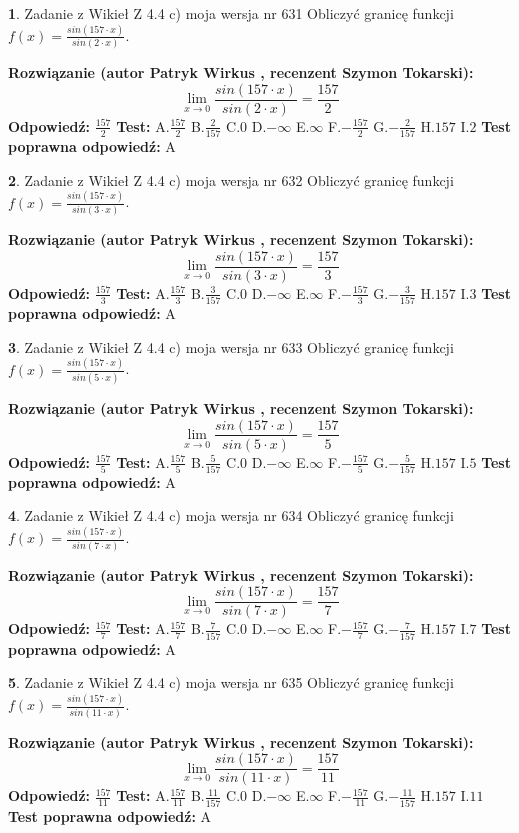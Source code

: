 \documentclass[12pt, a4paper]{article}
\theoremstyle{definition} %
\newtheorem{zad}{}
\newcommand{\zadStart}[1]{\begin{zad}#1\newline}
\newcommand{\zadStop}{\end{zad}}
\newcommand{\rozwStart}[2]{\noindent \textbf{Rozwiązanie (autor #1 , recenzent #2): }\newline}
\newcommand{\rozwStop}{\newline}
\newcommand{\odpStart}{\noindent \textbf{Odpowiedź:}\newline}
\newcommand{\odpStop}{\newline}
\newcommand{\testStart}{\noindent \textbf{Test:}\newline}
\newcommand{\testStop}{\newline}
\newcommand{\kluczStart}{\noindent \textbf{Test poprawna odpowiedź:}\newline}
\newcommand{\kluczStop}{\newline}
\begin{document}
\zadStart{Zadanie z Wikieł Z 4.4 c) moja wersja nr 631}
Obliczyć granicę funkcji $f(x)=\frac{sin(157\cdot x)}{sin(2\cdot x)}$.
\zadStop
\rozwStart{Patryk Wirkus}{Szymon Tokarski}
$$\lim\limits_{x\to 0}\frac{sin(157\cdot x)}{sin(2\cdot x)}=
\frac{157}{2}$$
\rozwStop
\odpStart
$\frac{157}{2}$
\odpStop
\testStart
A.$\frac{157}{2}$
B.$\frac{2}{157}$
C.$0$
D.$-\infty$
E.$\infty$
F.$-\frac{157}{2}$
G.$-\frac{2}{157}$
H.$157$
I.$2$
\testStop
\kluczStart
A
\kluczStop



\zadStart{Zadanie z Wikieł Z 4.4 c) moja wersja nr 632}
Obliczyć granicę funkcji $f(x)=\frac{sin(157\cdot x)}{sin(3\cdot x)}$.
\zadStop
\rozwStart{Patryk Wirkus}{Szymon Tokarski}
$$\lim\limits_{x\to 0}\frac{sin(157\cdot x)}{sin(3\cdot x)}=
\frac{157}{3}$$
\rozwStop
\odpStart
$\frac{157}{3}$
\odpStop
\testStart
A.$\frac{157}{3}$
B.$\frac{3}{157}$
C.$0$
D.$-\infty$
E.$\infty$
F.$-\frac{157}{3}$
G.$-\frac{3}{157}$
H.$157$
I.$3$
\testStop
\kluczStart
A
\kluczStop



\zadStart{Zadanie z Wikieł Z 4.4 c) moja wersja nr 633}
Obliczyć granicę funkcji $f(x)=\frac{sin(157\cdot x)}{sin(5\cdot x)}$.
\zadStop
\rozwStart{Patryk Wirkus}{Szymon Tokarski}
$$\lim\limits_{x\to 0}\frac{sin(157\cdot x)}{sin(5\cdot x)}=
\frac{157}{5}$$
\rozwStop
\odpStart
$\frac{157}{5}$
\odpStop
\testStart
A.$\frac{157}{5}$
B.$\frac{5}{157}$
C.$0$
D.$-\infty$
E.$\infty$
F.$-\frac{157}{5}$
G.$-\frac{5}{157}$
H.$157$
I.$5$
\testStop
\kluczStart
A
\kluczStop



\zadStart{Zadanie z Wikieł Z 4.4 c) moja wersja nr 634}
Obliczyć granicę funkcji $f(x)=\frac{sin(157\cdot x)}{sin(7\cdot x)}$.
\zadStop
\rozwStart{Patryk Wirkus}{Szymon Tokarski}
$$\lim\limits_{x\to 0}\frac{sin(157\cdot x)}{sin(7\cdot x)}=
\frac{157}{7}$$
\rozwStop
\odpStart
$\frac{157}{7}$
\odpStop
\testStart
A.$\frac{157}{7}$
B.$\frac{7}{157}$
C.$0$
D.$-\infty$
E.$\infty$
F.$-\frac{157}{7}$
G.$-\frac{7}{157}$
H.$157$
I.$7$
\testStop
\kluczStart
A
\kluczStop



\zadStart{Zadanie z Wikieł Z 4.4 c) moja wersja nr 635}
Obliczyć granicę funkcji $f(x)=\frac{sin(157\cdot x)}{sin(11\cdot x)}$.
\zadStop
\rozwStart{Patryk Wirkus}{Szymon Tokarski}
$$\lim\limits_{x\to 0}\frac{sin(157\cdot x)}{sin(11\cdot x)}=
\frac{157}{11}$$
\rozwStop
\odpStart
$\frac{157}{11}$
\odpStop
\testStart
A.$\frac{157}{11}$
B.$\frac{11}{157}$
C.$0$
D.$-\infty$
E.$\infty$
F.$-\frac{157}{11}$
G.$-\frac{11}{157}$
H.$157$
I.$11$
\testStop
\kluczStart
A
\kluczStop
\end{document}
